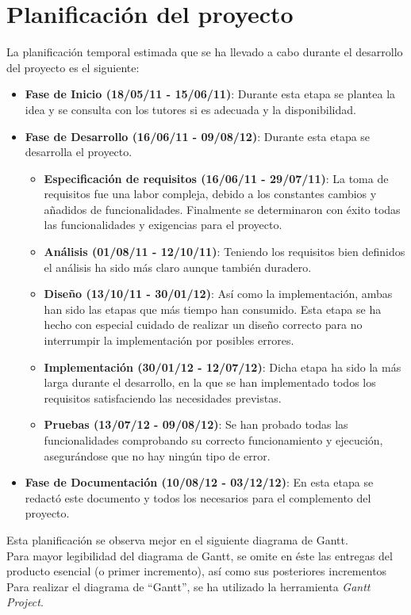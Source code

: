 \section{Planificación del proyecto}
La planificación temporal estimada que se ha llevado a cabo durante el desarrollo del proyecto es el siguiente:\\
\begin{itemize}
\item \textbf{Fase de Inicio (18/05/11 - 15/06/11)}: Durante esta etapa se plantea la idea y se consulta con los tutores si es adecuada y la disponibilidad.\\
\item \textbf{Fase de Desarrollo (16/06/11 - 09/08/12)}: Durante esta etapa se desarrolla el proyecto.
\begin{itemize}
\item \textbf{Especificación de requisitos (16/06/11 - 29/07/11)}: La toma de requisitos fue una labor compleja, debido a los constantes cambios y añadidos de funcionalidades. Finalmente se determinaron con éxito todas las funcionalidades y exigencias para el proyecto.
\item \textbf{Análisis (01/08/11 - 12/10/11)}: Teniendo los requisitos bien definidos el análisis ha sido más claro aunque también duradero.
\item \textbf{Diseño (13/10/11 - 30/01/12)}: Así como la implementación, ambas han sido las etapas que más tiempo han consumido. Esta etapa se ha hecho con especial cuidado de realizar un diseño correcto para no interrumpir la implementación por posibles errores.
\item \textbf{Implementación (30/01/12 - 12/07/12)}: Dicha etapa ha sido la más larga durante el desarrollo, en la que se han implementado todos los requisitos satisfaciendo las necesidades previstas.
\item \textbf{Pruebas (13/07/12 - 09/08/12)}: Se han probado todas las funcionalidades comprobando su correcto funcionamiento y ejecución, asegurándose que no hay ningún tipo de error.
\end{itemize}
\item \textbf{Fase de Documentación (10/08/12 - 03/12/12)}: En esta etapa se redactó este documento y todos los necesarios para el complemento del proyecto.
\end{itemize}

Esta planificación se observa mejor en el siguiente diagrama de Gantt.\\
Para mayor legibilidad del diagrama de Gantt, se omite en éste las entregas del producto esencial (o primer incremento), así como sus posteriores incrementos\\
Para realizar el diagrama de ``Gantt'', se ha utilizado la herramienta \textit{Gantt Project}.\\

